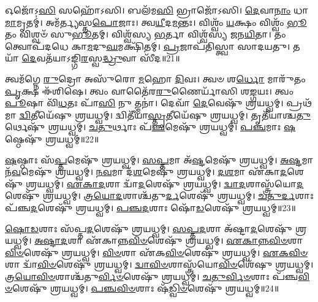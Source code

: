    𑌓𑌜𑍋᳴𑌽\-\ul{𑌸𑌿} 𑌸𑌹𑍋᳴𑌽𑌸𑌿।
   𑌬𑌲᳴𑌮\-\ul{𑌸𑌿} 𑌭𑍍𑌰𑌾𑌜𑍋᳴𑌽𑌸𑌿।
   \ul{𑌦𑍇}\-𑌵𑌾\-\ul{𑌨𑌾𑌂} 𑌧𑌾\-\ul{𑌮𑌾}\-𑌮𑍃𑌤𑌮𑍍॑।
   𑌅𑌮᳴𑌰𑍍𑌤𑍍𑌯𑌸𑍍𑌤\-\ul{𑌪𑍋}\-𑌜𑌾𑌃।
   𑌤𑍍𑌵\-\ul{𑌯𑍀}\-𑌦\-\ul{𑌮}\-𑌨𑍍𑌤𑌃।
   𑌵𑌿𑌶𑍍𑌵𑌂᳴ \ul{𑌯}\-𑌕𑍍𑌷𑌂 𑌵𑌿𑌶𑍍𑌵𑌂᳴ \ul{𑌭𑍂}\-𑌤𑌂 𑌵𑌿𑌶𑍍𑌵𑍞᳴ 𑌸𑍁\-\ul{𑌭𑍂}\-𑌤𑌮𑍍।
   𑌵𑌿𑌶𑍍𑌵᳴𑌸𑍍𑌯 \ul{𑌭}\-𑌰𑍍𑌤𑌾 𑌵𑌿𑌶𑍍𑌵᳴𑌸𑍍𑌯 𑌜𑌨\-\ul{𑌯𑌿}\-𑌤𑌾।
   𑌤𑌂 𑌤𑍍𑌵𑍋𑌪᳴𑌦𑌧𑍇 𑌕𑌾\-\ul{𑌮}\-𑌦𑍁\-\ul{𑌘}\-𑌮𑌕𑍍𑌷𑌿᳴𑌤𑌮𑍍।
   \ul{𑌪𑍍𑌰}\-𑌜𑌾𑌪᳴𑌤𑌿𑌸𑍍𑌤𑍍𑌵𑌾 𑌸𑌾𑌦𑌯𑌤𑍁।
   𑌤𑌯𑌾᳴ \ul{𑌦𑍇}\-𑌵𑌤᳴𑌯𑌾𑌽𑌙𑍍𑌗𑌿\-\ul{𑌰}\-𑌸𑍍𑌵\-\ul{𑌦𑍍𑌧𑍍𑌰𑍁}\-𑌵𑌾 𑌸𑍀᳴𑌦॥21॥
\anuvakamend

   𑌤𑍍𑌵𑌮᳴𑌗𑍍𑌨𑍇 \ul{𑌰𑍁}\-𑌦𑍍𑌰𑍋 𑌅𑌸𑍁᳴𑌰𑍋 \ul{𑌮}\-𑌹𑍋 \ul{𑌦𑌿}\-𑌵𑌃।
   𑌤𑍍𑌵𑍞 𑌶\-\ul{𑌰𑍍𑌧𑍋} 𑌮𑌾𑌰𑍁᳴𑌤𑌂 \ul{𑌪𑍃}\-𑌕𑍍𑌷 𑌈᳴𑌶𑌿𑌷𑍇।
   𑌤𑍍𑌵𑌂 𑌵𑌾𑌤𑍈᳴𑌰\-\ul{𑌰𑍁}\-𑌣𑍈𑌰𑍍𑌯𑌾᳴𑌸𑌿 𑌶\-\ul{𑌙𑍍𑌗}\-𑌯𑌃।
   𑌤𑍍𑌵𑌂 \ul{𑌪𑍂}\-𑌷𑌾 𑌵𑌿᳴\-\ul{𑌧}\-𑌤𑌃 𑌪𑌾᳴\-\ul{𑌸𑌿} 𑌨𑍁 𑌤𑍍𑌮𑌨𑌾॑।
   𑌦𑍇𑌵𑌾᳴ \ul{𑌦𑍇}\-𑌵𑍇𑌷𑍁᳴ 𑌶𑍍𑌰𑌯𑌧𑍍𑌵𑌮𑍍।
   𑌪𑍍𑌰𑌥᳴𑌮𑌾 \ul{𑌦𑍍𑌵𑌿}\-𑌤𑍀𑌯𑍇᳴𑌷𑍁 𑌶𑍍𑌰𑌯𑌧𑍍𑌵𑌮𑍍।
   𑌦𑍍𑌵𑌿𑌤𑍀᳴𑌯𑌾\-\ul{𑌸𑍍𑌤𑍃}\-𑌤𑍀𑌯𑍇᳴𑌷𑍁 𑌶𑍍𑌰𑌯𑌧𑍍𑌵𑌮𑍍।
   𑌤𑍃𑌤𑍀᳴𑌯𑌾𑌶𑍍𑌚\-\ul{𑌤𑍁}\-𑌰𑍍𑌥𑍇𑌷𑍁᳴ 𑌶𑍍𑌰𑌯𑌧𑍍𑌵𑌮𑍍।
   \ul{𑌚}\-\-\ul{𑌤𑍁}\-𑌰𑍍𑌥𑌾𑌃 𑌪᳴\-\ul{𑌞𑍍𑌚}\-𑌮𑍇𑌷𑍁᳴ 𑌶𑍍𑌰𑌯𑌧𑍍𑌵𑌮𑍍।
   \ul{𑌪}\-\-\ul{𑌞𑍍𑌚}\-𑌮𑌾𑌃 \ul{𑌷}\-𑌷𑍍𑌠𑍇𑌷𑍁᳴ 𑌶𑍍𑌰𑌯𑌧𑍍𑌵𑌮𑍍॥22॥

   \ul{𑌷}\-𑌷𑍍𑌠𑌾𑌃 𑌸᳴\-\ul{𑌪𑍍𑌤}\-𑌮𑍇𑌷𑍁᳴ 𑌶𑍍𑌰𑌯𑌧𑍍𑌵𑌮𑍍।
   \ul{𑌸}\-\-\ul{𑌪𑍍𑌤}\-𑌮𑌾 𑌅᳴\-\ul{𑌷𑍍𑌟}\-𑌮𑍇𑌷𑍁᳴ 𑌶𑍍𑌰𑌯𑌧𑍍𑌵𑌮𑍍।
   \ul{𑌅}\-\-\ul{𑌷𑍍𑌟}\-𑌮𑌾 𑌨᳴\-\ul{𑌵}\-𑌮𑍇𑌷𑍁᳴ 𑌶𑍍𑌰𑌯𑌧𑍍𑌵𑌮𑍍।
   \ul{𑌨}\-\-\ul{𑌵}\-𑌮𑌾 𑌦᳴\-\ul{𑌶}\-𑌮𑍇𑌷𑍁᳴ 𑌶𑍍𑌰𑌯𑌧𑍍𑌵𑌮𑍍।
   \ul{𑌦}\-\-\ul{𑌶}\-𑌮𑌾 𑌏᳴𑌕𑌾\-\ul{𑌦}\-𑌶𑍇𑌷𑍁᳴ 𑌶𑍍𑌰𑌯𑌧𑍍𑌵𑌮𑍍।
   \ul{𑌏}\-\-\ul{𑌕𑌾}\-\-\ul{𑌦}\-𑌶𑌾 𑌦𑍍𑌵𑌾᳴\-\ul{𑌦}\-𑌶𑍇𑌷𑍁᳴ 𑌶𑍍𑌰𑌯𑌧𑍍𑌵𑌮𑍍।
   \ul{𑌦𑍍𑌵𑌾}\-\-\ul{𑌦}\-𑌶𑌾𑌸𑍍𑌤𑍍𑌰᳴𑌯𑍋\-\ul{𑌦}\-𑌶𑍇𑌷𑍁᳴ 𑌶𑍍𑌰𑌯𑌧𑍍𑌵𑌮𑍍।
   \ul{𑌤𑍍𑌰}\-\-\ul{𑌯𑍋}\-\-\ul{𑌦}\-𑌶𑌾𑌶𑍍𑌚᳴𑌤𑍁\-\ul{𑌰𑍍𑌦}\-𑌶𑍇𑌷𑍁᳴ 𑌶𑍍𑌰𑌯𑌧𑍍𑌵𑌮𑍍।
   \ul{𑌚}\-\-\ul{𑌤𑍁}\-\-\ul{𑌰𑍍𑌦}\-𑌶𑌾𑌃 𑌪᳴𑌞𑍍𑌚\-\ul{𑌦}\-𑌶𑍇𑌷𑍁᳴ 𑌶𑍍𑌰𑌯𑌧𑍍𑌵𑌮𑍍।
   \ul{𑌪}\-\-\ul{𑌞𑍍𑌚}\-\-\ul{𑌦}\-𑌶𑌾𑌃 𑌷𑍋᳴\-\ul{𑌡}\-𑌶𑍇𑌷𑍁᳴ 𑌶𑍍𑌰𑌯𑌧𑍍𑌵𑌮𑍍॥23॥

   \ul{𑌷𑍋}\-\-\ul{𑌡}\-𑌶𑌾𑌃 𑌸᳴𑌪𑍍𑌤\-\ul{𑌦}\-𑌶𑍇𑌷𑍁᳴ 𑌶𑍍𑌰𑌯𑌧𑍍𑌵𑌮𑍍।
   \ul{𑌸}\-\-\ul{𑌪𑍍𑌤}\-\-\ul{𑌦}\-𑌶𑌾 𑌅᳴𑌷𑍍𑌟𑌾\-\ul{𑌦}\-𑌶𑍇𑌷𑍁᳴ 𑌶𑍍𑌰𑌯𑌧𑍍𑌵𑌮𑍍।
   \ul{𑌅}\-\-\ul{𑌷𑍍𑌟𑌾}\-\-\ul{𑌦}\-𑌶𑌾 𑌏᳴𑌕𑌾𑌨𑍍𑌨\-\-\ul{𑌵𑌿}\-\-\ul{𑍞}\-𑌶𑍇𑌷𑍁᳴ 𑌶𑍍𑌰𑌯𑌧𑍍𑌵𑌮𑍍।
   \ul{𑌏}\-\-\ul{𑌕𑌾}\-\-\ul{𑌨𑍍𑌨}\-\-\ul{𑌵𑌿}\-\-\ul{𑍞}\-𑌶𑌾 \ul{𑌵𑌿}\-\-\ul{𑍞}\-𑌶𑍇𑌷𑍁᳴ 𑌶𑍍𑌰𑌯𑌧𑍍𑌵𑌮𑍍।
   \ul{𑌵𑌿}\-\-\ul{𑍞}\-𑌶𑌾 𑌏᳴𑌕\-\ul{𑌵𑌿}\-\-\ul{𑍞}\-𑌶𑍇𑌷𑍁᳴ 𑌶𑍍𑌰𑌯𑌧𑍍𑌵𑌮𑍍।
   \ul{𑌏}\-\-\ul{𑌕}\-\-\ul{𑌵𑌿}\-\-\ul{𑍞}\-𑌶𑌾 𑌦𑍍𑌵𑌾᳴\-\ul{𑌵𑌿}\-\-\ul{𑍞}\-𑌶𑍇𑌷𑍁᳴ 𑌶𑍍𑌰𑌯𑌧𑍍𑌵𑌮𑍍।
   \ul{𑌦𑍍𑌵𑌾}\-\-\ul{𑌵𑌿}\-\-\ul{𑍞}\-𑌶𑌾𑌸𑍍𑌤𑍍𑌰᳴𑌯𑍋\-\ul{𑌵𑌿}\-\-\ul{𑍞}\-𑌶𑍇᳴𑌷𑍁 𑌶𑍍𑌰𑌯𑌧𑍍𑌵𑌮𑍍।
   \ul{𑌤𑍍𑌰}\-\-\ul{𑌯𑍋}\-\-\ul{𑌵𑌿}\-\-\ul{𑍞}\-𑌶𑌾𑌶𑍍𑌚᳴𑌤𑍁\-\ul{𑌰𑍍𑌵𑌿}\-\-\ul{𑍞}\-𑌶𑍇𑌷𑍁᳴ 𑌶𑍍𑌰𑌯𑌧𑍍𑌵𑌮𑍍।
   \ul{𑌚}\-\-\ul{𑌤𑍁}\-\-\ul{𑌰𑍍𑌵𑌿}\-\-\ul{𑍞}\-𑌶𑌾𑌃 𑌪᳴𑌞𑍍𑌚\-\ul{𑌵𑌿}\-\-\ul{𑍞}\-𑌶𑍇𑌷𑍁᳴ 𑌶𑍍𑌰𑌯𑌧𑍍𑌵𑌮𑍍।
   \ul{𑌪}\-\-\ul{𑌞𑍍𑌚}\-\-\ul{𑌵𑌿}\-\-\ul{𑍞}\-𑌶𑌾𑌃 𑌷᳴\-\ul{𑌡𑍍𑌵𑌿}\-\-\ul{𑍞}\-𑌶𑍇𑌷𑍁᳴ 𑌶𑍍𑌰𑌯𑌧𑍍𑌵𑌮𑍍॥24॥

